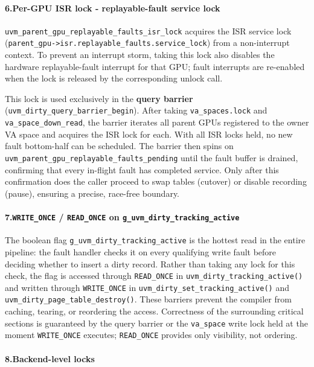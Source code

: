 \paragraph{6.\enspace Per-GPU ISR lock - replayable-fault service lock}

\texttt{uvm\_parent\_gpu\_replayable\_faults\_isr\_lock} acquires the ISR
service lock (\texttt{parent\_gpu->isr.replayable\_faults.service\_lock})
from a non-interrupt context.
To prevent an interrupt storm, taking this lock also disables the hardware
replayable-fault interrupt for that GPU; fault interrupts are re-enabled when
the lock is released by the corresponding unlock call.

This lock is used exclusively in the \textbf{query barrier}
(\texttt{uvm\_dirty\_query\_barrier\_begin}).
After taking \texttt{va\_spaces.lock} and \texttt{va\_space\_down\_read},
the barrier iterates all parent GPUs registered to the owner VA space and
acquires the ISR lock for each.
With all ISR locks held, no new fault bottom-half can be scheduled.
The barrier then spins on \texttt{uvm\_parent\_gpu\_replayable\_faults\_pending}
until the fault buffer is drained, confirming that every in-flight fault has
completed service.
Only after this confirmation does the caller proceed to swap tables (cutover)
or disable recording (pause), ensuring a precise, race-free boundary.

\paragraph{7.\enspace\texttt{WRITE\_ONCE} / \texttt{READ\_ONCE} on \texttt{g\_uvm\_dirty\_tracking\_active}}

The boolean flag \texttt{g\_uvm\_dirty\_tracking\_active} is the hottest
read in the entire pipeline: the fault handler checks it on every qualifying
write fault before deciding whether to insert a dirty record.
Rather than taking any lock for this check, the flag is accessed through
\texttt{READ\_ONCE} in \texttt{uvm\_dirty\_tracking\_active()} and written
through \texttt{WRITE\_ONCE} in \texttt{uvm\_dirty\_set\_tracking\_active()}
and \texttt{uvm\_dirty\_page\_table\_destroy()}.
These barriers prevent the compiler from caching, tearing, or reordering the
access.
Correctness of the surrounding critical sections is guaranteed by the
query barrier or the \texttt{va\_space} write lock held at the moment
\texttt{WRITE\_ONCE} executes; \texttt{READ\_ONCE} provides only
visibility, not ordering.

\paragraph{8.\enspace Backend-level locks}

